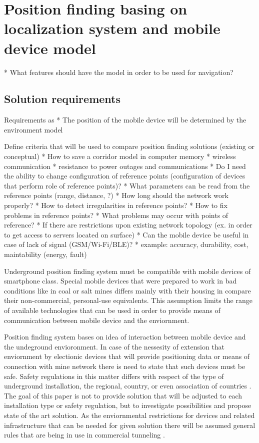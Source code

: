 \documentclass[../main.tex]{subfiles}
\begin{document}
\chapter{Position finding basing on localization system and mobile device model}
* What features should have the model in order to be used for navigation?

\section{Solution requirements}
Requirements as
* The position of the mobile device will be determined by the environment model

Define criteria that will be used to compare position finding solutions (existing or conceptual)
* How to save a corridor model in computer memory
* wireless communication
* resistance to power outages and communications
* Do I need the ability to change configuration of reference points (configuration of devices that perform role of reference points)?
* What parameters can be read from the reference points (range, distance, ?)
* How long should the network work properly?
* How to detect irregularities in reference points?
* How to fix problems in reference points?
* What problems may occur with points of reference?
* If there are restrictions upon existing network topology (ex. in order to get access to servers located on surface)
* Can the mobile device be useful in case of lack of signal (GSM/Wi-Fi/BLE)?
* example: accuracy, durability, cost, maintability (energy, fault)

Underground position finding system must be compatible with mobile devices of smartphone class. Special mobile devices that were prepared to work in bad conditions like in coal or salt mines differs mainly with their housing in compare their non-commercial, personal-use equivalents. This assumption limits the range of available technologies that can be used in order to provide means of communication between mobile device and the enviornment.

Position finding system bases on idea of interaction between mobile device and the undeground envioronment. In case of the nessesity of extension that enviornment by electionic devices that will provide positioning data or means of connection with mine network there is need to state that such devices must be safe. Safety regulations in this matter differs with respect of the type of underground installation, the regional, country, or even association of countries \cite{Thesis_CM}. The goal of this paper is not to provide solution that will be adjusted to each installation type or safety regulation, but to investigate possibilities and propose state of the art solution. As the enviornmental restrictions for devices and related infrastructure that can be needed for given solution there will be assumed general rules that are being in use in commercial tunneling \cite{Thesis_CM}.
\end{document}
